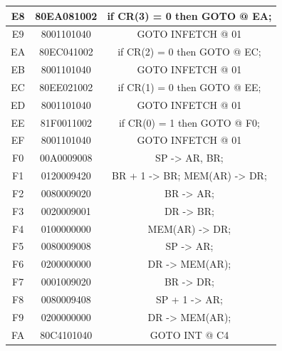 \begin{center}
\begin{tabular}{|c|c|c|}
        \hline
        E8  & 80EA081002    & if CR(3) = 0 then GOTO @ EA; \\
        \hline
        E9  & 8001101040    & GOTO INFETCH @ 01 \\
        \hline
        EA  & 80EC041002    & if CR(2) = 0 then GOTO @ EC; \\
        \hline
        EB  & 8001101040    & GOTO INFETCH @ 01 \\
        \hline
        EC  & 80EE021002    & if CR(1) = 0 then GOTO @ EE; \\
        \hline
        ED  & 8001101040    & GOTO INFETCH @ 01 \\
        \hline
        EE  & 81F0011002    & if CR(0) = 1 then GOTO @ F0; \\
        \hline
        EF  & 8001101040    & GOTO INFETCH @ 01 \\
        \hline
        F0  & 00A0009008    & SP -> AR, BR; \\
        \hline
        F1  & 0120009420    & BR + 1 -> BR; MEM(AR) -> DR; \\
        \hline
        F2  & 0080009020    & BR -> AR; \\
        \hline
        F3  & 0020009001    & DR -> BR; \\
        \hline
        F4  & 0100000000    & MEM(AR) -> DR; \\
        \hline
        F5  & 0080009008    & SP -> AR; \\
        \hline
        F6  & 0200000000    & DR -> MEM(AR); \\
        \hline
        F7  & 0001009020    & BR -> DR; \\
        \hline
        F8  & 0080009408    & SP + 1 -> AR; \\
        \hline
        F9  & 0200000000    & DR -> MEM(AR); \\
        \hline
        FA  & 80C4101040    & GOTO INT @ C4 \\
        \hline
    \end{tabular}
\end{center}

